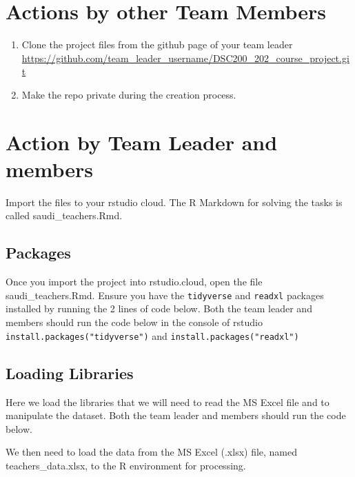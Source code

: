 \documentclass[
]{article}
\begin{document}
\hypertarget{actions-by-other-team-members}{%
\section{Actions by other Team
Members}\label{actions-by-other-team-members}}

\begin{enumerate}
\def\labelenumi{\arabic{enumi}.}
\item
  Clone the project files from the github page of your team leader
  \url{https://github.com/team_leader_username/DSC200_202_course_project.git}
\item
  Make the repo private during the creation process.
\end{enumerate}

\hypertarget{action-by-team-leader-and-members}{%
\section{Action by Team Leader and
members}\label{action-by-team-leader-and-members}}

Import the files to your rstudio cloud. The R Markdown for solving the
tasks is called saudi\_teachers.Rmd.

\hypertarget{packages}{%
\subsection{Packages}\label{packages}}

Once you import the project into rstudio.cloud, open the file
saudi\_teachers.Rmd. Ensure you have the \texttt{tidyverse} and
\texttt{readxl} packages installed by running the 2 lines of code below.
Both the team leader and members should run the code below in the
console of rstudio \texttt{install.packages("tidyverse")} and
\texttt{install.packages("readxl")}

\hypertarget{loading-libraries}{%
\subsection{Loading Libraries}\label{loading-libraries}}

Here we load the libraries that we will need to read the MS Excel file
and to manipulate the dataset. Both the team leader and members should
run the code below.

We then need to load the data from the MS Excel (.xlsx) file, named
teachers\_data.xlsx, to the R environment for processing.
\end{document}
